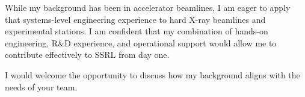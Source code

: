 \documentclass[11pt, a4paper]{awesome-cv} %
\begin{document}
\begin{cvletter}
{While my background has been in accelerator beamlines, I am eager to apply that systems-level engineering experience to hard X-ray beamlines and experimental stations. I am confident that my combination of hands-on engineering, R\&D experience, and operational support would allow me to contribute effectively to SSRL from day one.
}

I would welcome the opportunity to discuss how my background aligns with the needs of your team.









\end{cvletter}


\makeletterclosing %
\end{document}
